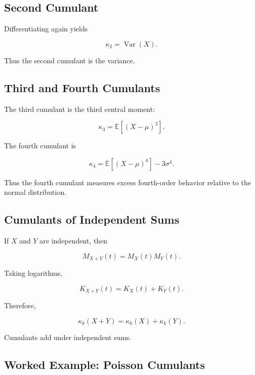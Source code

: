\subsection{Second Cumulant}
\label{subsec:second-cumulant}

Differentiating again yields

\[
\boxed{
\kappa_2
=
\operatorname{Var}(X).
}
\]

Thus the second cumulant is the variance.

\subsection{Third and Fourth Cumulants}
\label{subsec:higher-cumulants}

The third cumulant is the third central moment:

\[
\boxed{
\kappa_3
=
\mathbb{E}
[
(X-\mu)^3
].
}
\]

The fourth cumulant is

\[
\boxed{
\kappa_4
=
\mathbb{E}
[
(X-\mu)^4
]
-
3\sigma^4.
}
\]

Thus the fourth cumulant measures excess fourth-order behavior relative
to the normal distribution.

\subsection{Cumulants of Independent Sums}
\label{subsec:cumulants-independent-sums}

If \(X\) and \(Y\) are independent, then

\[
M_{X+Y}(t)
=
M_X(t)M_Y(t).
\]

Taking logarithms,

\[
K_{X+Y}(t)
=
K_X(t)+K_Y(t).
\]

Therefore,

\[
\boxed{
\kappa_k(X+Y)
=
\kappa_k(X)
+
\kappa_k(Y).
}
\]

Cumulants add under independent sums.

\subsection{Worked Example: Poisson Cumulants}
\label{subsec:worked-poisson-cumulants}

